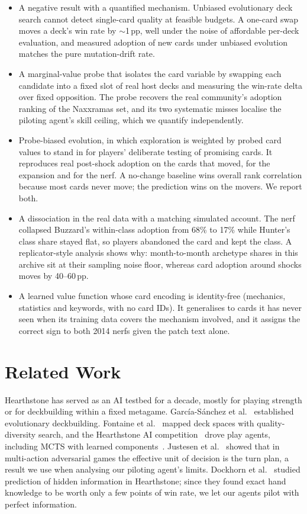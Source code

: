 \documentclass[conference]{IEEEtran}
\newcommand{\pp}{\,\text{pp}}
\begin{document}
\begin{itemize}
\item A negative result with a quantified mechanism. Unbiased
evolutionary deck search cannot detect single-card quality at
feasible budgets. A one-card swap moves a deck's win rate by
$\sim$1$\pp$, well under the noise of affordable per-deck evaluation,
and measured adoption of new cards under unbiased evolution matches
the pure mutation-drift rate.
\item A marginal-value probe that isolates the card variable by
swapping each candidate into a fixed slot of real host decks and
measuring the win-rate delta over fixed opposition. The probe
recovers the real community's adoption ranking of the Naxxramas set,
and its two systematic misses localise the piloting agent's skill
ceiling, which we quantify independently.
\item Probe-biased evolution, in which exploration is weighted by
probed card values to stand in for players' deliberate testing of
promising cards. It reproduces real post-shock adoption on the cards
that moved, for the expansion and for the nerf. A no-change baseline
wins overall rank correlation because most cards never move; the
prediction wins on the movers. We report both.
\item A dissociation in the real data with a matching simulated
account. The nerf collapsed Buzzard's within-class adoption from
68\% to 17\% while Hunter's class share stayed flat, so players
abandoned the card and kept the class. A replicator-style analysis
shows why: month-to-month archetype shares in this archive sit at
their sampling noise floor, whereas card adoption around shocks
moves by 40--60$\pp$.
\item A learned value function whose card encoding is identity-free
(mechanics, statistics and keywords, with no card IDs). It
generalises to cards it has never seen when its training data covers
the mechanism involved, and it assigns the correct sign to both 2014
nerfs given the patch text alone.
\end{itemize}

\section{Related Work}

Hearthstone has served as an AI testbed for a decade, mostly for
playing strength or for deckbuilding within a fixed metagame.
Garc\'ia-S\'anchez et al.~\cite{garcia2016evodeck} established
evolutionary deckbuilding. Fontaine et
al.~\cite{fontaine2019mapelites} mapped deck spaces with
quality-diversity search, and the Hearthstone AI
competition~\cite{dockhorn2019competition} drove play agents,
including MCTS with learned components~\cite{swiechowski2018}.
Justesen et al.~\cite{justesen2017} showed that in multi-action
adversarial games the effective unit of decision is the turn plan, a
result we use when analysing our piloting agent's limits. Dockhorn
et al.~\cite{dockhorn2018prediction} studied prediction of hidden
information in Hearthstone; since they found exact hand knowledge to
be worth only a few points of win rate, we let our agents pilot with
perfect information.
\end{document}
